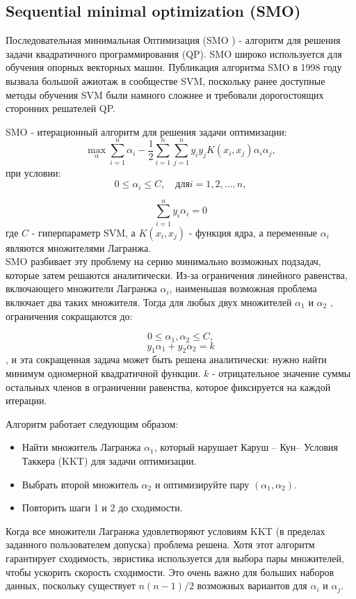 \documentclass[12pt,a4paper]{article}
\begin{document}
	\subsection{Sequential minimal optimization (SMO)}
	Последовательная минимальная Оптимизация (SMO ) - алгоритм для решения задачи квадратичного программирования (QP).  SMO широко используется для обучения опорных векторных машин. Публикация алгоритма SMO в 1998 году вызвала большой ажиотаж в сообществе SVM, поскольку ранее доступные методы обучения SVM были намного сложнее и требовали дорогостоящих сторонних решателей QP.
	
	SMO - итерационный алгоритм для решения задачи оптимизации:
	\begin{equation}
		\max_{\alpha}\sum_{i=1}^{n}\alpha_{i}-{\frac{1}{2}}\sum_{i=1}^{n}\sum_{j=1}^{n}y_{i}y_{j}K(x_{i},x_{j})\alpha_{i}\alpha_{j},
	\end{equation}
		 при условии:
	\begin{equation}
		0\leq \alpha_{i}\leq C, \quad \mbox{для} i=1,2,\ldots ,n,		
	\end{equation}

	\begin{equation}
		\sum_{i=1}^{n}y_{i}\alpha_{i}=0
	\end{equation}
где $C$ - гиперпараметр SVM, а $K(x_i, x_j)$ - функция ядра, а переменные $\alpha_{i}$ являются множителями Лагранжа.\\
	

	 SMO разбивает эту проблему на серию минимально возможных подзадач, которые затем решаются аналитически. Из-за ограничения линейного равенства, включающего множители Лагранжа $\alpha_{i}$, наименьшая возможная проблема включает два таких множителя. Тогда для любых двух множителей $\alpha_{1}$ и $\alpha_{2}$ , ограничения сокращаются до:
	
$$0 \leq \alpha_{1}, \alpha_{2} \leq C,$$
$$ y_{1}\alpha_{1} + y_{2}\alpha_{2} = k$$ 
	, и эта сокращенная задача может быть решена аналитически: нужно найти минимум одномерной квадратичной функции. $k$ - отрицательное значение суммы остальных членов в ограничении равенства, которое фиксируется на каждой итерации.
	
	Алгоритм работает следующим образом:
	
	\begin{itemize}
		\item Найти множитель Лагранжа $\alpha_{1}$, который нарушает Каруш – Кун– Условия Таккера (KKT) для задачи оптимизации.
		\item Выбрать второй множитель $\alpha_{2}$ и оптимизируйте пару $(\alpha_{1}, \alpha_{2})$.
		\item Повторить шаги 1 и 2 до сходимости.
	\end{itemize}	
	
	Когда все множители Лагранжа удовлетворяют условиям KKT (в пределах заданного пользователем допуска) проблема решена. Хотя этот алгоритм гарантирует сходимость, эвристика используется для выбора пары множителей, чтобы ускорить скорость сходимости. Это очень важно для больших наборов данных, поскольку существует $n(n-1)/2$ возможных вариантов для $\alpha_{i}$ и $\alpha_{j}$.
	
\end{document}
